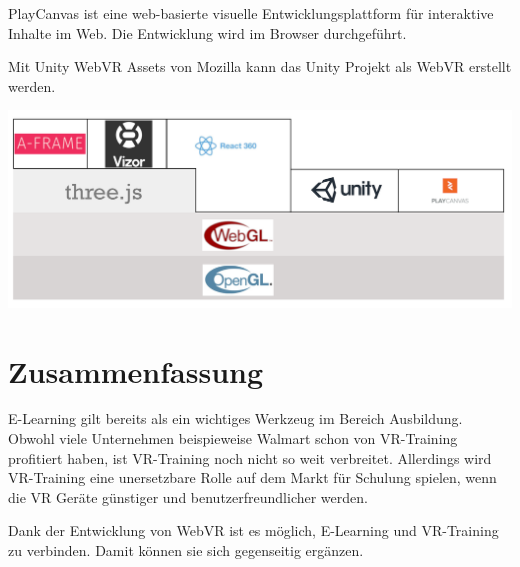  PlayCanvas ist eine web-basierte visuelle Entwicklungsplattform für interaktive Inhalte im Web. Die Entwicklung wird im Browser durchgeführt.
 
 Mit Unity WebVR Assets von Mozilla kann das Unity Projekt als WebVR erstellt werden.

\includegraphics[width=\textwidth]{images/webVRStruckture.png}

\section{Zusammenfassung}
E-Learning gilt bereits als ein wichtiges Werkzeug im Bereich Ausbildung. Obwohl viele Unternehmen beispieweise Walmart \citep{24} schon von VR-Training profitiert haben, ist VR-Training noch nicht so weit verbreitet. Allerdings wird VR-Training eine unersetzbare Rolle auf dem Markt für Schulung spielen, wenn die VR Geräte günstiger und benutzerfreundlicher werden.

Dank der Entwicklung von WebVR ist es möglich, E-Learning und VR-Training zu verbinden. Damit können sie sich gegenseitig ergänzen.


